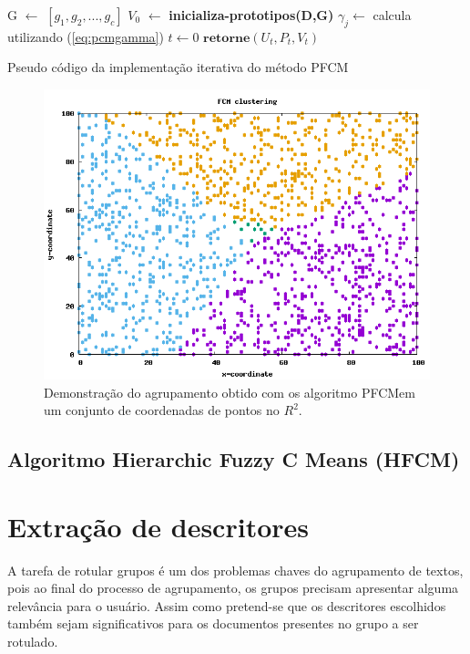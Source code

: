 \begin{algorithm}[H] 
  \SetAlgoLined {} 
  G $\gets$ $[g_1,g_2,...,g_c]$\; 
  $V_0$ $\gets$ \textbf{{\color{blue}inicializa-prototipos}(D,G)}\; 
  $\gamma_j \gets$ calcula utilizando (\ref{eq:pcmgamma})\;
  $t \gets 0$\; 
  $\textbf{retorne} (U_t,P_t,V_t)$\; 
  \caption{Pseudo código da implementação iterativa do método PFCM}
  \label{alg:pfcm} 
\end{algorithm}

\begin{figure}[!htp] 
  \centering 
  \includegraphics[width=0.6\columnwidth]{assets/samples_pfcm.png}
  \caption{Demonstração do agrupamento obtido com os algoritmo 
    PFCM\protect\footnotemark em um conjunto de coordenadas de pontos no $R^2$.} 
  \label{fig:samples_pfcm} 
\end{figure}

\subsection{Algoritmo Hierarchic Fuzzy C Means (HFCM)}

\section{Extração de descritores} 

A tarefa de rotular grupos é um dos problemas chaves do agrupamento de textos, pois ao final do
processo de agrupamento, os grupos precisam apresentar alguma relevância para o
usuário\cite{Zhang2008}. Assim como pretend-se que os descritores escolhidos também sejam
significativos para os documentos presentes no grupo a ser rotulado. 

